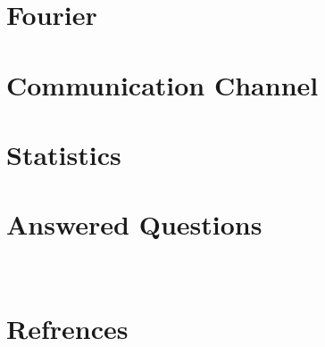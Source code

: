 \documentclass{article}
\numberwithin{equation}{section}%
\begin{document}
\pagecolor{mainTheme}\afterpage{\pagecolor{backCirc}}
\maketitle
\thispagestyle{empty}



\newcommand{\TonDpage}[1]{
  \newpage
  \renewcommand{\Places}{#1}
}


\TonDpage{Fourier}
\vspace*{-0.5 em}
\section{Fourier}

\vspace{10pt}


\vspace*{-0.5 em}
\section{Communication Channel}

\vspace{30pt}


\vspace*{-0.5 em}
\section{Statistics}

\vspace{10pt}


\section{Answered Questions}


~\\%
\section{Refrences}\vspace{0.5em}

\end{document}
